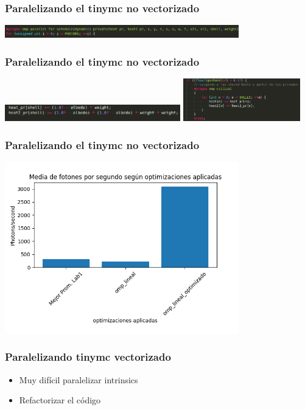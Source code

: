 \documentclass{beamer}
\begin{document}
    \begin{frame}
        \frametitle{Paralelizando el tinymc no vectorizado}
        \includegraphics[width=4in]{imagenes/opt_omp_lin_3.png}

    \end{frame}

    \begin{frame}
        \frametitle{Paralelizando el tinymc no vectorizado}

        \includegraphics[width=3in]{imagenes/opt_omp_lin_4.png} \pause
        \includegraphics[width=2in]{imagenes/opt_omp_lin_5.png}

    \end{frame}

    \begin{frame}
        \frametitle{Paralelizando el tinymc no vectorizado}
        \includegraphics[width=4in]{imagenes/comp_prom_2.png}
    \end{frame}

    \begin{frame}
        \frametitle{Paralelizando tinymc vectorizado}
        \begin{itemize}
            \item Muy difícil paralelizar intrinsics
            \item Refactorizar el código
        \end{itemize}
    \end{frame}
\end{document}
